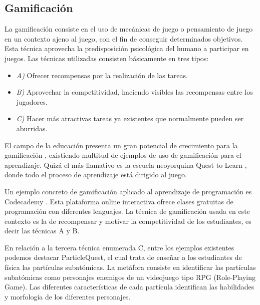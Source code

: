 \documentclass{llncs}
\begin{document}
\subsection{Gamificación}
\label{subsec:gamification}

La gamificación consiste en el uso de mecánicas de juego o pensamiento de juego en un contexto ajeno al juego, con el fin de conseguir determinados objetivos. Esta técnica aprovecha la predisposición psicológica del humano a participar en juegos. Las técnicas utilizadas consisten básicamente en tres tipos:
\begin{itemize}
\item {\em A)} Ofrecer recompensas por la realización de las tareas. 
\item {\em B)} Aprovechar la competitividad, haciendo visibles las recompensas entre los jugadores.
\item {\em C)} Hacer más atractivas tareas ya existentes que normalmente pueden ser aburridas. 
\end{itemize}

El campo de la educación presenta un gran potencial de crecimiento para la gamificación \cite{lee2011gamification}, existiendo multitud de ejemplos de uso de gamificación para el aprendizaje. Quizá el más llamativo es la escuela neoyorquina Quest to Learn \cite{salen2011quest}, donde todo el proceso de aprendizaje está dirigido al juego. 

Un ejemplo concreto de gamificación aplicado al aprendizaje de programación es Codecademy \cite{codecademy}. Esta plataforma online interactiva ofrece clases gratuitas de programación con diferentes lenguajes. La técnica de gamificación usada en este contexto es la de recompensar y motivar la competitividad de los estudiantes, es decir las técnicas A y B. 


En relación a la tercera técnica enumerada C, entre los ejemplos existentes podemos destacar ParticleQuest, el cual trata de enseñar a los estudiantes de física las partículas subatómicas. La metáfora consiste en identificar las partículas subatómicas como personajes enemigos de un videojuego tipo RPG (Role-Playing Game). Las diferentes características de cada partícula identifican las habilidades y morfología de los diferentes personajes. 
\end{document}
